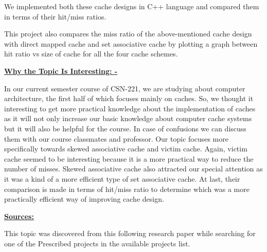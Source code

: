 \documentclass[12pt]{article}
\begin{document}
{\fontsize{14pt}{16.8pt}\selectfont We implemented both these cache designs in C++ language and compared them in terms of their hit/miss ratios.\par}\par

{\fontsize{14pt}{16.8pt}\selectfont This project also compares the miss ratio of the above-mentioned cache design with direct mapped cache and set associative cache by plotting a graph between hit ratio vs size of cache for all the four cache schemes.\par}\par




\newpage

\vspace{\baselineskip}
\vspace{\baselineskip}
{\fontsize{22pt}{26.4pt}\selectfont \textbf{\uline{Why the Topic Is Interesting: -}}\par}\par

{\fontsize{14pt}{16.8pt}\selectfont In our current semester course of CSN-221, we are studying about computer architecture, the first half of which focuses mainly on caches. So, we thought it interesting to get more practical knowledge about the implementation of caches as it will not only increase our basic knowledge about computer cache systems but it will also be helpful for the course. In case of confusions we can discuss them with our course classmates and professor. Our topic focuses more specifically towards skewed associative cache and victim cache. Again, victim cache seemed to be interesting because it is a more practical way to reduce the number of misses. Skewed associative cache also attracted our special attention as it was a kind of a more efficient type of set associative cache. At last, their comparison is made in terms of hit/miss ratio to determine which was a more practically efficient way of improving cache design.\par}\par

{\fontsize{22pt}{26.4pt}\selectfont \textbf{\uline{Sources:}}\par}\par

{\fontsize{14pt}{16.8pt}\selectfont This topic was discovered from this following research paper while searching for one of the Prescribed projects in the available projects list.\par}\par
\end{document}
